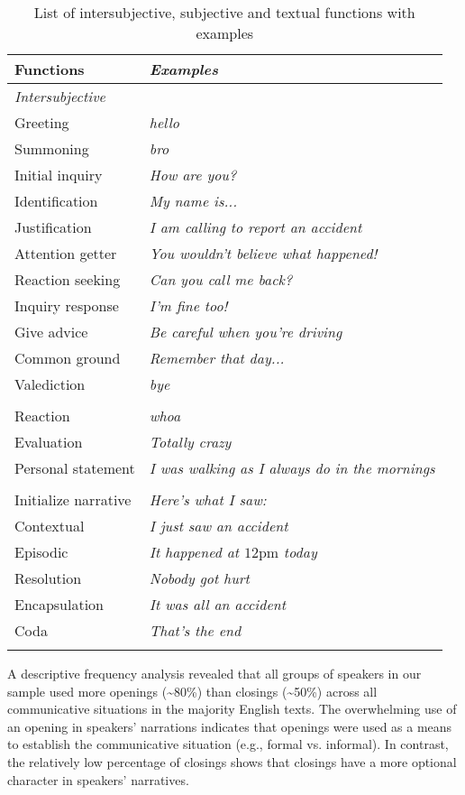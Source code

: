\documentclass[output=paper,colorlinks,citecolor=brown]{langscibook}
\begin{document}
\begin{table}
\begin{tabular}{l >{\itshape} l}
\lsptoprule 
Functions & {\normalfont Examples} \\
\midrule \multicolumn{2}{l}{\textit{Intersubjective}} \\
Greeting & {hello} \\
Summoning & {bro} \\
Initial inquiry & {How are you?} \\
Identification & {My name is...} \\
Justification & {I am calling to report an accident} \\
Attention getter & {You wouldn't believe what happened!} \\
Reaction seeking & {Can you call me back?} \\
Inquiry response & {I'm fine too!} \\
Give advice & {Be careful when you're driving} \\
Common ground & {Remember that day...} \\
Valediction & {bye} \\\tablevspace

\multicolumn{2}{l}{\textit{Subjective}} \\
Reaction & {whoa} \\
Evaluation & {Totally crazy} \\
Personal statement & {I was walking as I always do in the mornings} \\\tablevspace

\multicolumn{2}{l}{\textit{Textual}} \\
Initialize narrative & {Here's what I saw:} \\
Contextual & {I just saw an accident} \\
Episodic & {It happened at $12 \mathrm{pm}$ today} \\
Resolution & {Nobody got hurt} \\
Encapsulation & {It was all an accident} \\
Coda & {That's the end} \\
\lspbottomrule
\end{tabular}
\caption{List of intersubjective, subjective and textual functions with examples }
\label{tab:pashkovaetal:discourse}
\end{table}


A descriptive frequency analysis revealed that all groups of speakers in our sample used more openings ({\textasciitilde}80\%) than closings ({\textasciitilde}50\%) across all communicative situations in the majority English texts. The overwhelming use of an opening in speakers’ narrations indicates that openings were used as a means to establish the communicative situation (e.g., formal vs. informal). In contrast, the relatively low percentage of closings shows that closings have a more optional character in speakers’ narratives.
\end{document}
